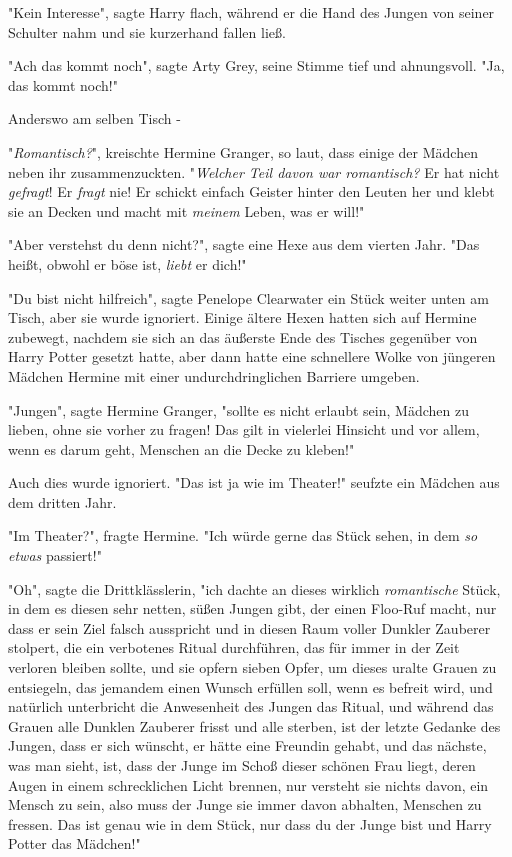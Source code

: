 {"Kein Interesse", sagte Harry flach, während er die Hand des Jungen von seiner Schulter nahm und sie kurzerhand fallen ließ.

"Ach das kommt noch", sagte Arty Grey, seine Stimme tief und ahnungsvoll. "Ja, das kommt noch!"

Anderswo am selben Tisch -

"\emph{Romantisch?}", kreischte Hermine Granger, so laut, dass einige der Mädchen neben ihr zusammenzuckten. "\emph{Welcher Teil davon war romantisch?} Er hat nicht \emph{gefragt}! Er \emph{fragt} nie! Er schickt einfach Geister hinter den Leuten her und klebt sie an Decken und macht mit \emph{meinem} Leben, was er will!"

"Aber verstehst du denn nicht?", sagte eine Hexe aus dem vierten Jahr. "Das heißt, obwohl er böse ist, \emph{liebt} er dich!"

"Du bist nicht hilfreich", sagte Penelope Clearwater ein Stück weiter unten am Tisch, aber sie wurde ignoriert. Einige ältere Hexen hatten sich auf Hermine zubewegt, nachdem sie sich an das äußerste Ende des Tisches gegenüber von Harry Potter gesetzt hatte, aber dann hatte eine schnellere Wolke von jüngeren Mädchen Hermine mit einer undurchdringlichen Barriere umgeben.

"Jungen", sagte Hermine Granger, "sollte es nicht erlaubt sein, Mädchen zu lieben, ohne sie vorher zu fragen! Das gilt in vielerlei Hinsicht und vor allem, wenn es darum geht, Menschen an die Decke zu kleben!"

Auch dies wurde ignoriert. "Das ist ja wie im Theater!" seufzte ein Mädchen aus dem dritten Jahr.

"Im Theater?", fragte Hermine. "Ich würde gerne das Stück sehen, in dem \emph{so etwas} passiert!"

"Oh", sagte die Drittklässlerin, "ich dachte an dieses wirklich \emph{romantische} Stück, in dem es diesen sehr netten, süßen Jungen gibt, der einen Floo-Ruf macht, nur dass er sein Ziel falsch ausspricht und in diesen Raum voller Dunkler Zauberer stolpert, die ein verbotenes Ritual durchführen, das für immer in der Zeit verloren bleiben sollte, und sie opfern sieben Opfer, um dieses uralte Grauen zu entsiegeln, das jemandem einen Wunsch erfüllen soll, wenn es befreit wird, und natürlich unterbricht die Anwesenheit des Jungen das Ritual, und während das Grauen alle Dunklen Zauberer frisst und alle sterben, ist der letzte Gedanke des Jungen, dass er sich wünscht, er hätte eine Freundin gehabt, und das nächste, was man sieht, ist, dass der Junge im Schoß dieser schönen Frau liegt, deren Augen in einem schrecklichen Licht brennen, nur versteht sie nichts davon, ein Mensch zu sein, also muss der Junge sie immer davon abhalten, Menschen zu fressen. Das ist genau wie in dem Stück, nur dass du der Junge bist und Harry Potter das Mädchen!"

}
